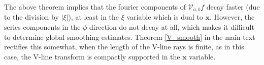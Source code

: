 \documentclass[a4paper,12pt]{amsart}
\numberwithin{equation}{section}
\theoremstyle{plain}
\numberwithin{theorem}{section}
\theoremstyle{definition}
\theoremstyle{remark}
\theoremstyle{remark}
\theoremstyle{remark}
\newcommand{\vx}{{\mathbf{x}}}
\begin{document}
The above theorem implies that the fourier components of $\mathcal{V}_{a,b} f$ decay faster  (due to the division by $|\xi|$), at least in the $\xi$ variable which is dual to $\vx$. However, the series components in the $\phi$ direction do not decay at all, which makes it difficult to determine global smoothing estimates. Theorem \ref{V_smooth} in the main text rectifies this somewhat, when the length of the V-line rays is finite, as in this case, the V-line transform is compactly supported in the $\vx$ variable.
\end{document}
